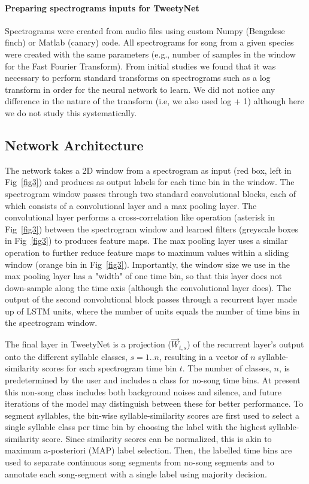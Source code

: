 \documentclass[10pt,letterpaper]{article}
\begin{document}
\paragraph{Preparing spectrograms inputs for TweetyNet}
Spectrograms were created from audio files using custom Numpy (Bengalese finch) or Matlab (canary) code.
All spectrograms for song from a given species were created with the same parameters (e.g., number of 
samples in the window for the Fast Fourier Transform). From initial studies we found that it was necessary 
to perform standard transforms on spectrograms such as a log transform in order for the neural network to 
learn. We did not notice any difference in the nature of the transform (i.e, we also used log + 1) 
although here we do not study this systematically.

\subsection*{Network Architecture}
The network takes a 2D window from a spectrogram as input (red box, left in Fig~\ref{fig3}) and produces as output 
labels for each time bin in the window. 
The spectrogram window passes through two standard convolutional blocks, 
each of which consists of a convolutional layer and a max pooling layer. 
The convolutional layer performs a cross-correlation
like operation (asterisk in Fig~\ref{fig3}) between the spectrogram window and learned filters (greyscale boxes in Fig~\ref{fig3}) to produces feature maps.
The max pooling layer uses a similar operation to further reduce feature maps to maximum values within a sliding 
window (orange bin in Fig~\ref{fig3}). Importantly, the window size we use in the max pooling layer has a "width" of one time bin, so that this 
layer does not down-sample along the time axis (although the convolutional layer does).
The output of the second convolutional block passes through a recurrent layer made up of LSTM units, where 
the number of units equals the number of time bins in the spectrogram window.

The final layer in TweetyNet is a projection ($\overrightarrow{W}_{t,s}$) of the recurrent layer's output onto the different syllable classes, $s=1..n$, resulting in a vector of $n$ syllable-similarity scores for each spectrogram time bin $t$. The number of classes, $n$, is predetermined by the user and includes a class for no-song time bins. At present this non-song class includes both background noises and silence, and future iterations of the model may distinguish between these for better performance. To segment syllables, the bin-wise syllable-similarity scores are first used to select a single syllable class per time bin by choosing the label with the highest syllable-similarity score. Since similarity scores can be normalized, this is akin to maximum a-posteriori (MAP) label selection. Then, the labelled time bins are used to separate continuous song segments from no-song segments and to annotate each song-segment with a single label using majority decision.  
\end{document}
